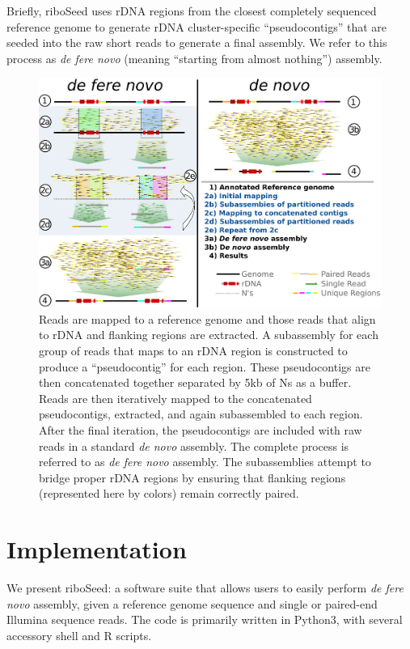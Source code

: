 \documentclass[10pt]{article}
\begin{document}
\begin{linenumbers}
Briefly, riboSeed uses rDNA regions from the closest completely sequenced reference genome to generate rDNA cluster-specific ``pseudocontigs'' that are seeded into the raw short reads to generate a final assembly. We refer to this process as \textit{de fere novo} (meaning ``starting from almost nothing'') assembly.


\begin{figure}[!h]
  \centering
  \includegraphics[width=.8\textwidth]{riboSeed_v11}
  \caption{Reads are mapped to a reference genome and those reads that align to rDNA and flanking regions are extracted. A subassembly for each group of reads that maps to an rDNA region is constructed to produce a ``pseudocontig'' for each region. These pseudocontigs are then concatenated together separated by 5kb of Ns as a buffer. Reads are then iteratively mapped to the concatenated pseudocontigs, extracted, and again subassembled to each region. After the final iteration, the pseudocontigs are included with raw reads in a standard \textit{de novo} assembly. The complete process is referred to as \textit{de fere novo} assembly. The subassemblies attempt to bridge proper rDNA regions by ensuring that flanking regions (represented here by colors) remain correctly paired.
  }
  \label{fig:overview}
\end{figure}




\section*{Implementation}
We present riboSeed: a software suite that allows users to easily perform \textit{de fere novo} assembly, given a reference genome sequence and single or paired-end Illumina sequence reads. The code is primarily written in Python3, with several accessory shell and R scripts.



\end{linenumbers}
\end{document}
